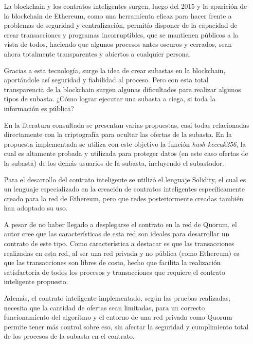 \begin{conclusions}
    La blockchain y los contratos inteligentes surgen, luego del 2015 y la aparición de la blockchain de Ethereum, como una herramienta eficaz para hacer frente a problemas de seguridad y centralización, permitío disponer de la capacidad de crear transacciones y programas incorruptibles, que se mantienen públicos a la vista de todos, haciendo que algunos procesos antes oscuros y cerrados, sean ahora totalmente transparentes y abiertos a cualquier persona.

    Gracias a esta tecnología, surge la idea de crear subastas en la blockchain, aportándole así seguridad
    y fiabilidad al proceso. Pero con esta total transparencia de la blockchain surgen algunas dificultades
    para realizar algunos tipos de subasta. ¿Cómo lograr ejecutar una subasta a ciega, si toda la información
    es pública?

    En la literatura consultada se presentan varias propuestas, casi todas relacionadas directamente
    con la criptografía para ocultar las ofertas de la subasta. En la propuesta implementada se utiliza con
    este objetivo la función \textit{hash keccak256}, la cual es altamente probada y utilizada para 
    proteger datos (en este caso ofertas de la subasta) de los demás usuarios de la subasta, incluyendo 
    el subastador.

    Para el desarrollo del contrato inteligente se utilizó el lenguaje Solidity, el cual es un lenguaje
    especializado en la creación de contratos inteligentes específicamente creado para la red de 
    Ethereum, pero que redes posteriormente creadas también han adoptado su uso.

    A pesar de no haber llegado a desplegarse el contrato en la red de Quorum, el autor cree que las
    características de esta red son ideales para desarrollar un contrato de este tipo. Como característica
    a destacar es que las transacciones realizadas en esta red, al ser una red privada y no pública (como 
    Ethereum) es que las transacciones son libres de costo, hecho que facilita la realización satisfactoria
    de todos los procesos y transacciones que requiere el contrato inteligente propuesto.

    Además, el contrato inteligente implementado, según las pruebas realizadas, necesita que la cantidad
    de ofertas sean limitadas, para un correcto funcionamiento del algoritmo y el entorno de una red
    privada como Quorum permite tener más control sobre eso, sin afectar la seguridad y cumplimiento
    total de los procesos de la subasta en el contrato.
\end{conclusions}
